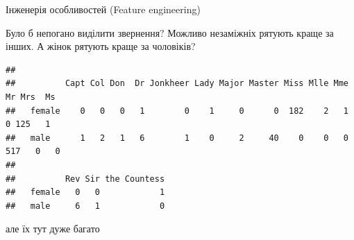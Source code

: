 \documentclass[ignorenonframetext,]{beamer}
\newenvironment{Shaded}{\begin{snugshade}}{\end{snugshade}}
\newcommand{\CharTok}[1]{\textcolor[rgb]{0.31,0.60,0.02}{#1}}
\newcommand{\KeywordTok}[1]{\textcolor[rgb]{0.13,0.29,0.53}{\textbf{#1}}}
\newcommand{\NormalTok}[1]{#1}
\newcommand{\OperatorTok}[1]{\textcolor[rgb]{0.81,0.36,0.00}{\textbf{#1}}}
\newcommand{\StringTok}[1]{\textcolor[rgb]{0.31,0.60,0.02}{#1}}
\begin{document}
\begin{frame}[fragile]{Інженерія особливостей (Feature engineering)}
\protect\hypertarget{ux456ux43dux436ux435ux43dux435ux440ux456ux44f-ux43eux441ux43eux431ux43bux438ux432ux43eux441ux442ux435ux439-feature-engineering}{}

Було б непогано виділити звернення? Можливо незаміжніх рятують краще за
інших. А жінок рятують краще за чоловіків?

\begin{Shaded}
\end{Shaded}

\begin{verbatim}
##         
##          Capt Col Don  Dr Jonkheer Lady Major Master Miss Mlle Mme  Mr Mrs  Ms
##   female    0   0   0   1        0    1     0      0  182    2   1   0 125   1
##   male      1   2   1   6        1    0     2     40    0    0   0 517   0   0
##         
##          Rev Sir the Countess
##   female   0   0            1
##   male     6   1            0
\end{verbatim}

але їх тут дуже багато

\end{frame}
\end{document}
